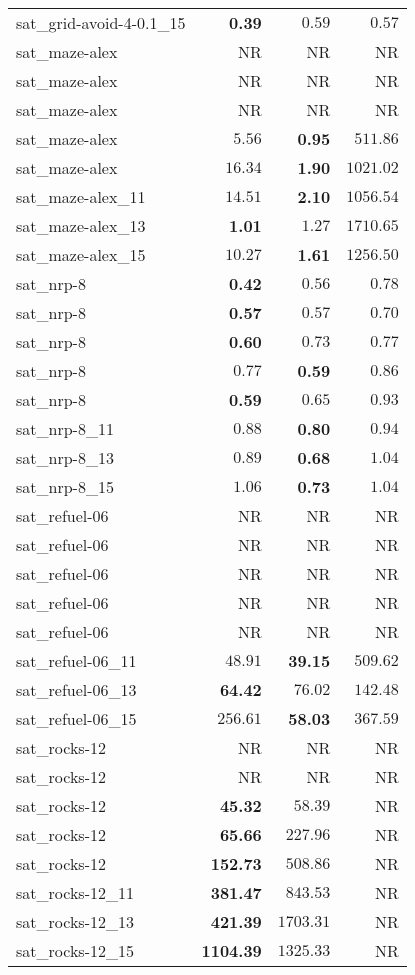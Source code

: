 \begin{tabular}{lrrr}
sat\_grid-avoid-4-0.1\_15 & \textbf{0.39} & $0.59$ & $0.57$ \\
sat\_maze-alex & NR & NR & NR \\
sat\_maze-alex & NR & NR & NR \\
sat\_maze-alex & NR & NR & NR \\
sat\_maze-alex & $5.56$ & \textbf{0.95} & $511.86$ \\
sat\_maze-alex & $16.34$ & \textbf{1.90} & $1021.02$ \\
sat\_maze-alex\_11 & $14.51$ & \textbf{2.10} & $1056.54$ \\
sat\_maze-alex\_13 & \textbf{1.01} & $1.27$ & $1710.65$ \\
sat\_maze-alex\_15 & $10.27$ & \textbf{1.61} & $1256.50$ \\
sat\_nrp-8 & \textbf{0.42} & $0.56$ & $0.78$ \\
sat\_nrp-8 & \textbf{0.57} & $0.57$ & $0.70$ \\
sat\_nrp-8 & \textbf{0.60} & $0.73$ & $0.77$ \\
sat\_nrp-8 & $0.77$ & \textbf{0.59} & $0.86$ \\
sat\_nrp-8 & \textbf{0.59} & $0.65$ & $0.93$ \\
sat\_nrp-8\_11 & $0.88$ & \textbf{0.80} & $0.94$ \\
sat\_nrp-8\_13 & $0.89$ & \textbf{0.68} & $1.04$ \\
sat\_nrp-8\_15 & $1.06$ & \textbf{0.73} & $1.04$ \\
sat\_refuel-06 & NR & NR & NR \\
sat\_refuel-06 & NR & NR & NR \\
sat\_refuel-06 & NR & NR & NR \\
sat\_refuel-06 & NR & NR & NR \\
sat\_refuel-06 & NR & NR & NR \\
sat\_refuel-06\_11 & $48.91$ & \textbf{39.15} & $509.62$ \\
sat\_refuel-06\_13 & \textbf{64.42} & $76.02$ & $142.48$ \\
sat\_refuel-06\_15 & $256.61$ & \textbf{58.03} & $367.59$ \\
sat\_rocks-12 & NR & NR & NR \\
sat\_rocks-12 & NR & NR & NR \\
sat\_rocks-12 & \textbf{45.32} & $58.39$ & NR \\
sat\_rocks-12 & \textbf{65.66} & $227.96$ & NR \\
sat\_rocks-12 & \textbf{152.73} & $508.86$ & NR \\
sat\_rocks-12\_11 & \textbf{381.47} & $843.53$ & NR \\
sat\_rocks-12\_13 & \textbf{421.39} & $1703.31$ & NR \\
sat\_rocks-12\_15 & \textbf{1104.39} & $1325.33$ & NR \\
\bottomrule
\end{tabular}
